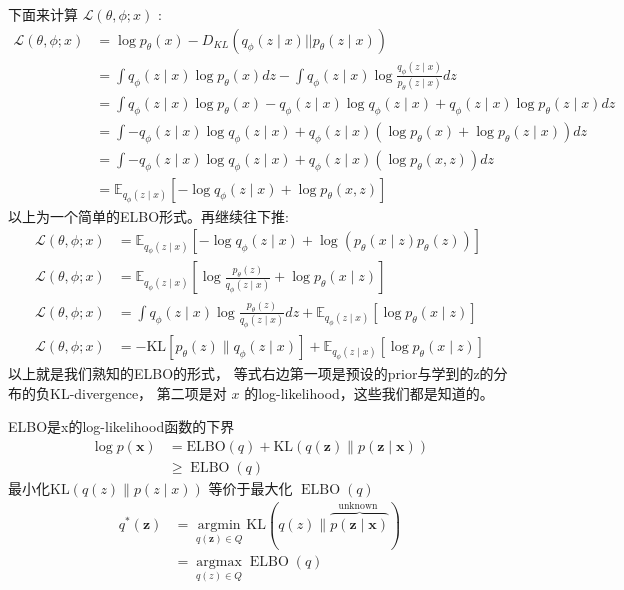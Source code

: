 \documentclass[UTF8]{ctexart}
\numberwithin{equation}{section}
\begin{document}
下面来计算 $\mathcal{L}(\theta, \phi ; x)$ :
$$
\begin{aligned}
\mathcal{L}(\theta, \phi ; x)&=\log p_{\theta}(x)-D_{K L}\left(q_{\phi}(z \mid x)|| p_{\theta}(z \mid x)\right) \\
&=\int q_{\phi}(z \mid x) \log p_{\theta}(x) d z-\int q_{\phi}(z \mid x) \log \frac{q_{\phi}(z \mid x)}{p_{\theta}(z \mid x)} d z \\
&=\int q_{\phi}(z \mid x) \log p_{\theta}(x)-q_{\phi}(z \mid x) \log q_{\phi}(z \mid x)+q_{\phi}(z \mid x) \log p_{\theta}(z \mid x) d z \\
&=\int-q_{\phi}(z \mid x) \log q_{\phi}(z \mid x)+q_{\phi}(z \mid x)\left(\log p_{\theta}(x)+\log p_{\theta}(z \mid x)\right) d z \\
&=\int-q_{\phi}(z \mid x) \log q_{\phi}(z \mid x)+q_{\phi}(z \mid x)\left(\log p_{\theta}(x, z)\right) d z \\
&=\mathbb{E}_{q_{\phi}(z \mid x)}\left[-\log q_{\phi}(z \mid x)+\log p_{\theta}(x, z)\right]
\end{aligned}
$$
以上为一个简单的ELBO形式。再继续往下推:
$$
\begin{aligned}
\mathcal{L}(\theta, \phi ; x) &=\mathbb{E}_{q_{\phi}(z \mid x)}\left[-\log q_{\phi}(z \mid x)+\log \left(p_{\theta}(x \mid z) p_{\theta}(z)\right)\right] \\
\mathcal{L}(\theta, \phi ; x) &=\mathbb{E}_{q_{\phi}(z \mid x)}\left[\log \frac{p_{\theta}(z)}{q_{\phi}(z \mid x)}+\log p_{\theta}(x \mid z)\right] \\
\mathcal{L}(\theta, \phi ; x) &=\int q_{\phi}(z \mid x) \log \frac{p_{\theta}(z)}{q_{\phi}(z \mid x)} d z+\mathbb{E}_{q_{\phi}(z \mid x)}\left[\log p_{\theta}(x \mid z)\right] \\
\mathcal{L}(\theta, \phi ; x) &=-\mathrm{KL}\left[p_{\theta}(z) \| q_{\phi}(z \mid x)\right]+\mathbb{E}_{q_{\phi}(z \mid x)}\left[\log p_{\theta}(x \mid z)\right]
\end{aligned}
$$
以上就是我们熟知的ELBO的形式，
等式右边第一项是预设的prior与学到的z的分布的负KL-divergence，
第二项是对 $x$ 的log-likelihood，这些我们都是知道的。

ELBO是x的log-likelihood函数的下界
$$
\begin{aligned}
\log p(\boldsymbol{x}) &=\mathrm{ELBO}(q)+\mathrm{KL}(q(\boldsymbol{z}) \| p(\boldsymbol{z} \mid \boldsymbol{x})) \\
& \geq \operatorname{ELBO}(q)
\end{aligned}
$$
最小化$\mathrm{KL}(q(z) \| p(z \mid x))$ 等价于最大化 $\operatorname{ELBO}(q)$
$$
\begin{aligned}
q^{*}(\boldsymbol{z}) &=\underset{q(\boldsymbol{z}) \in Q}{\operatorname{argmin}} \mathrm{KL}(q(z) \| \overbrace{p(\boldsymbol{z} \mid \boldsymbol{x})}^{\text {unknown }}) \\
&=\underset{q(z) \in Q}{\operatorname{argmax}} \operatorname{ELBO}(q)
\end{aligned}
$$
\end{document}
